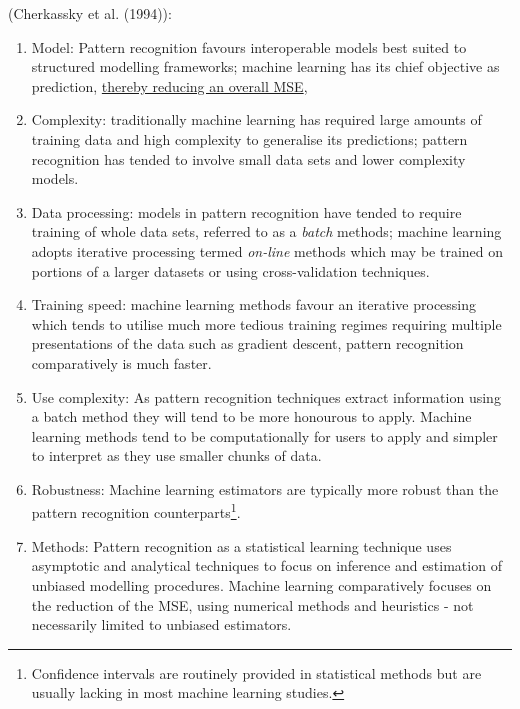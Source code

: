 \documentclass[7pt]{article}
\begin{document}
 (Cherkassky et al. (1994)):\\
\begin{enumerate}
\item Model: Pattern recognition favours interoperable models best suited  to structured modelling frameworks; machine learning has its chief objective as prediction, \underline{thereby reducing an overall MSE}, 
\item Complexity: traditionally machine learning has required large amounts of training data and high complexity to generalise its predictions; pattern recognition has tended to involve small data sets and lower complexity models. 
\item Data processing: models in pattern recognition have tended to require training of whole data sets, referred to as a \textit{batch} methods; machine learning adopts iterative processing termed \textit{on-line} methods which may be trained on portions of a larger datasets or using cross-validation techniques. 
\item Training speed: machine learning methods favour an iterative processing which tends to utilise much more tedious training regimes requiring multiple presentations of the data such as gradient descent, pattern recognition comparatively is much faster. 
\item Use complexity: As pattern recognition techniques extract information using a batch method they will tend to be more honourous to apply. Machine learning methods tend to be computationally for users to apply and simpler to interpret as they use smaller chunks of data.
\item Robustness: Machine learning estimators are typically more robust than the pattern recognition counterparts\footnote{Confidence intervals are routinely provided in statistical methods but are usually lacking in most machine learning studies.}.  
\item Methods: Pattern recognition as a statistical learning technique uses asymptotic and analytical techniques to focus on inference and estimation of unbiased modelling procedures. Machine learning comparatively focuses on the reduction of the MSE, using numerical methods and heuristics - not necessarily limited to unbiased estimators. 
\end{enumerate}
\end{document}
